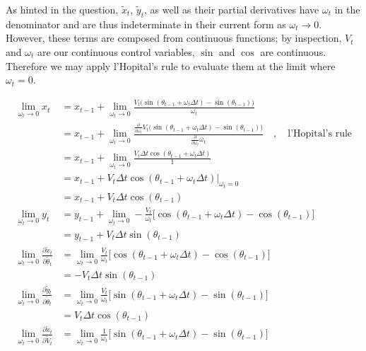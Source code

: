 \documentclass{article}
\begin{document}
\begin{enumerate}[label=(\roman*)]
As hinted in the question, $\tilde x_t$, $\tilde y_t$, as well as their partial derivatives have $\omega_t$ in the denominator and are thus indeterminate in their current form as $\omega_t \to 0$. However, these terms are composed from continuous functions; by inspection, $V_t$ and $\omega_t$ are our continuous control variables, $\sin$ and $\cos$ are continuous. Therefore we may apply l'Hopital's rule to evaluate them at the limit where $\omega_t = 0$.

\pagebreak

\begin{equation}
\begin{aligned}
\lim_{\omega_t \to 0} x_t
&= x_{t-1} + \lim_{\omega_t \to 0} \frac{V_t \big(\sin(\theta_{t-1} + \omega_t\Delta t) - \sin(\theta_{t-1})\big)}{\omega_t} \\
&= x_{t-1} + \lim_{\omega_t \to 0} \frac{ \frac{\partial}{\partial \omega_t} V_t \big(\sin(\theta_{t-1} + \omega_t\Delta t) - \sin(\theta_{t-1})\big)}{ \frac{\partial}{\partial \omega_t} \omega_t} \quad, \quad \text{l'Hopital's rule} \\
&= x_{t-1} + \lim_{\omega_t \to 0} \frac{V_t \Delta t \cos(\theta_{t-1} + \omega_t \Delta t)}{1} \\
&= x_{t-1} + V_t \Delta t \cos(\theta_{t-1} + \omega_t \Delta t) \Big\rvert_{\omega_t = 0} \\
&= x_{t-1} + V_t \Delta t \cos(\theta_{t-1})
\\
\lim_{\omega_t \to 0} y_t
&= y_{t-1} + \lim_{\omega_t \to 0} - \frac{V_t}{\omega_t} \Big[ \cos(\theta_{t-1} + \omega_t\Delta t) - \cos(\theta_{t-1}) \Big] \\
&= y_{t-1} + V_t \Delta t \sin(\theta_{t-1})
\\
\lim_{\omega_t \to 0} \frac{\partial \tilde x_t}{\partial \tilde \theta_t}
&= \lim_{\omega_t \to 0} \frac{V_t}{\omega_t} \Big[ \cos(\theta_{t-1} + \omega_t \Delta t) - \cos(\theta_{t-1}) \Big] \\
&= -V_t \Delta t \sin(\theta_{t-1})
\\
\lim_{\omega_t \to 0} \frac{\partial \tilde y_t}{\partial \tilde \theta_t}
&= \lim_{\omega_t \to 0} \frac{V_t}{\omega_t} \Big[ \sin(\theta_{t-1} + \omega_t \Delta t) - \sin(\theta_{t-1}) \Big] \\
&= V_t \Delta t \cos(\theta_{t-1})
\\
\lim_{\omega_t \to 0} \frac{\partial \tilde x_t}{\partial \tilde V_t}
&= \lim_{\omega_t \to 0} \frac{1}{\omega_t} \Big[ \sin(\theta_{t-1} + \omega_t\Delta t) - \sin(\theta_{t-1}) \Big] \\

\end{aligned}
\end{equation}
\end{enumerate}
\end{document}
